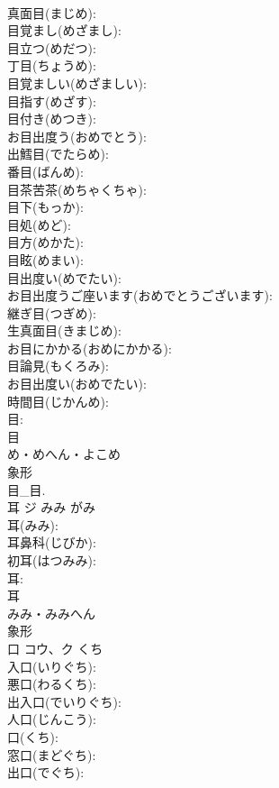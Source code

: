 \documentclass[8pt]{extreport}
\begin{document}
\begin{CJK}{UTF8}{min}
\\	真面目(まじめ): 
\\	目覚まし(めざまし): 
\\	目立つ(めだつ): 
\\	丁目(ちょうめ): 
\\	目覚ましい(めざましい): 
\\	目指す(めざす): 
\\	目付き(めつき): 
\\	お目出度う(おめでとう): 
\\	出鱈目(でたらめ): 
\\	番目(ばんめ): 
\\	目茶苦茶(めちゃくちゃ): 
\\	目下(もっか): 
\\	目処(めど): 
\\	目方(めかた): 
\\	目眩(めまい): 
\\	目出度い(めでたい): 
\\	お目出度うご座います(おめでとうございます): 
\\	継ぎ目(つぎめ): 
\\	生真面目(きまじめ): 
\\	お目にかかる(おめにかかる): 
\\	目論見(もくろみ): 
\\	お目出度い(おめでたい): 
\\	時間目(じかんめ): 
\\	目: 
\\	目	
\\	め・めへん・よこめ	
\\	象形 
\\	目_目.
\\	耳	ジ	みみ	がみ	
\\	耳(みみ): 
\\	耳鼻科(じびか): 
\\	初耳(はつみみ): 
\\	耳: 
\\	耳	
\\	みみ・みみへん	
\\	象形 
\\	口	コウ、ク	くち		
\\	入口(いりぐち): 
\\	悪口(わるくち): 
\\	出入口(でいりぐち): 
\\	人口(じんこう): 
\\	口(くち): 
\\	窓口(まどぐち): 
\\	出口(でぐち): 

\end{CJK}
\end{document}
